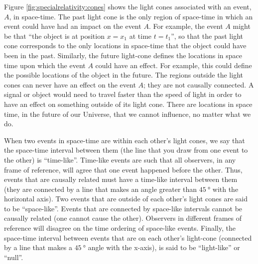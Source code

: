 Figure \ref{fig:specialrelativity:cones} shows the light cones associated with an event, $A$, in space-time. The past light cone is the only region of space-time in which an event could have had an impact on the event $A$. For example, the event $A$ might be that ``the object is at position $x=x_1$ at time $t=t_1$'', so that the past light cone corresponds to the only locations in space-time that the object could have been in the past. Similarly, the future light-cone defines the locations in space time upon which the event $A$ could have an effect. For example, this could define the possible locations of the object in the future. The regions outside the light cones can never have an effect on the event $A$; they are not causally connected. A signal or object would need to travel faster than the speed of light in order to have an effect on something outside of its light cone. There are locations in space time, in the future of our Universe, that we cannot influence, no matter what we do.

When two events in space-time are within each other's light cones, we say that the space-time interval between them (the line that you draw from one event to the other) is ``time-like''. Time-like events are such that all observers, in any frame of reference, will agree that one event happened before the other. Thus, events that are causally related must have a time-like interval between them (they are connected by a line that makes an angle greater than $\SI{45}{\degree}$ with the horizontal axis). Two events that are outside of each other's light cones are said to be ``space-like''. Events that are connected by space-like intervals cannot be causally related (one cannot cause the other). Observers in different frames of reference will disagree on the time ordering of space-like events. Finally, the space-time interval between events that are on each other's light-cone (connected by a line that makes a $\SI{45}{\degree}$ angle with the x-axis), is said to be ``light-like'' or ``null''. 

